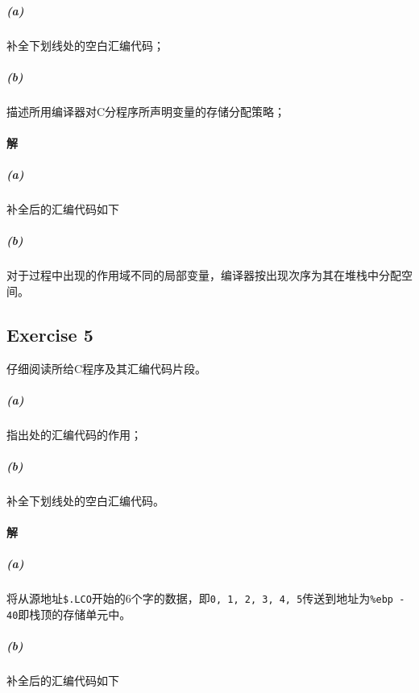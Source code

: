 \documentclass{article}
\newcommand{\CodeBlock}[2]{
    \begin{figure}[H]
        \begin{mdframed}[
            style = Default,
        ]
            
        \end{mdframed}
    \end{figure}
}
\begin{document}
\begin{multicols}{2}
\CodeBlock{C}{./Ex4.c}

\CodeBlock{Assembler}{./Ex4_Unfilled.s}
\end{multicols}

\subparagraph*{(a)}
补全下划线处的空白汇编代码；
\subparagraph*{(b)}
描述所用编译器对C分程序所声明变量的存储分配策略；

\paragraph{解}
\subparagraph*{(a)}
补全后的汇编代码如下

\CodeBlock{Assembler}{./Ex4_Filled.s}

\subparagraph*{(b)}
对于过程中出现的作用域不同的局部变量，编译器按出现次序为其在堆栈中分配空间。

\newpage

\begin{multicols}{2}
\section*{Exercise 5}
仔细阅读所给C程序及其汇编代码片段。

\subparagraph*{(a)}
指出处的汇编代码的作用；
\subparagraph*{(b)}
补全下划线处的空白汇编代码。

\CodeBlock{C}{./Ex5.c}

\CodeBlock{Assembler}{./Ex5_Unfilled.s}
\end{multicols}

\paragraph{解}
\subparagraph*{(a)}
将从源地址\lstinline[style = Assembler]{$.LCO}开始的6个字的数据，即\lstinline{0, 1, 2, 3, 4, 5}传送到地址为\lstinline[style = Assembler]{%ebp - 40}即栈顶的存储单元中。
\subparagraph*{(b)}
补全后的汇编代码如下
\CodeBlock{Assembler}{./Ex5_Filled.s}
\end{document}
